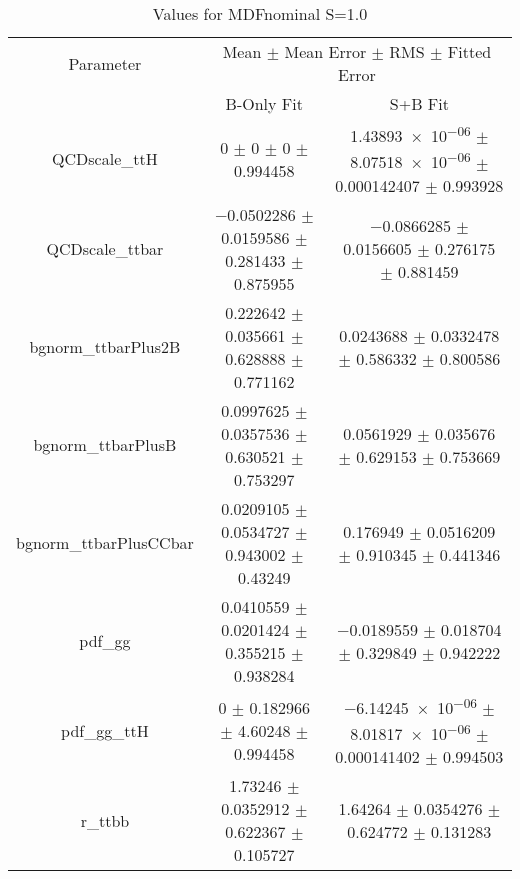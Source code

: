 \begin{table}
\centering
\caption{Values for MDFnominal S=1.0}
\begin{tabular}{ccc}
\toprule
Parameter & \multicolumn{2}{c}{Mean $\pm$ Mean Error $\pm$ RMS $\pm$ Fitted Error}\\
 & B-Only Fit & S+B Fit\\
\midrule
QCDscale\_ttH & \num{0} $\pm$ \num{0} $\pm$ \num{0} $\pm$ \num{0.994458} & \num{1.43893e-06} $\pm$ \num{8.07518e-06} $\pm$ \num{0.000142407} $\pm$ \num{0.993928}\\
QCDscale\_ttbar & \num{-0.0502286} $\pm$ \num{0.0159586} $\pm$ \num{0.281433} $\pm$ \num{0.875955} & \num{-0.0866285} $\pm$ \num{0.0156605} $\pm$ \num{0.276175} $\pm$ \num{0.881459}\\
bgnorm\_ttbarPlus2B & \num{0.222642} $\pm$ \num{0.035661} $\pm$ \num{0.628888} $\pm$ \num{0.771162} & \num{0.0243688} $\pm$ \num{0.0332478} $\pm$ \num{0.586332} $\pm$ \num{0.800586}\\
bgnorm\_ttbarPlusB & \num{0.0997625} $\pm$ \num{0.0357536} $\pm$ \num{0.630521} $\pm$ \num{0.753297} & \num{0.0561929} $\pm$ \num{0.035676} $\pm$ \num{0.629153} $\pm$ \num{0.753669}\\
bgnorm\_ttbarPlusCCbar & \num{0.0209105} $\pm$ \num{0.0534727} $\pm$ \num{0.943002} $\pm$ \num{0.43249} & \num{0.176949} $\pm$ \num{0.0516209} $\pm$ \num{0.910345} $\pm$ \num{0.441346}\\
pdf\_gg & \num{0.0410559} $\pm$ \num{0.0201424} $\pm$ \num{0.355215} $\pm$ \num{0.938284} & \num{-0.0189559} $\pm$ \num{0.018704} $\pm$ \num{0.329849} $\pm$ \num{0.942222}\\
pdf\_gg\_ttH & \num{0} $\pm$ \num{0.182966} $\pm$ \num{4.60248} $\pm$ \num{0.994458} & \num{-6.14245e-06} $\pm$ \num{8.01817e-06} $\pm$ \num{0.000141402} $\pm$ \num{0.994503}\\
r\_ttbb & \num{1.73246} $\pm$ \num{0.0352912} $\pm$ \num{0.622367} $\pm$ \num{0.105727} & \num{1.64264} $\pm$ \num{0.0354276} $\pm$ \num{0.624772} $\pm$ \num{0.131283}\\
\bottomrule
\end{tabular}
\end{table}